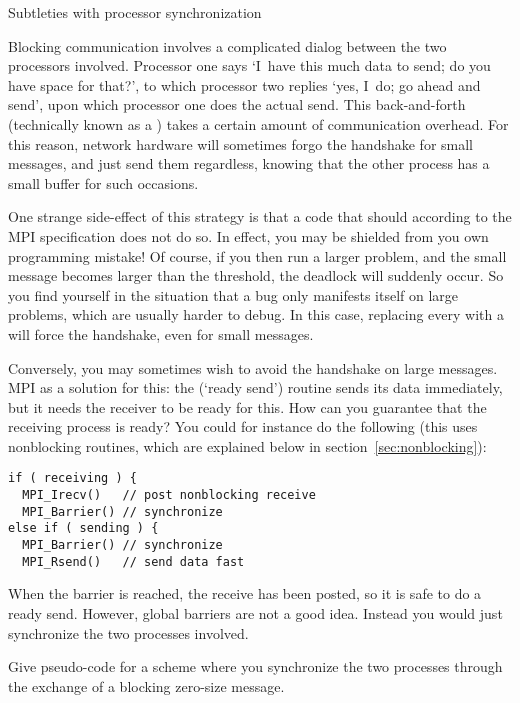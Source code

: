
 {Subtleties with processor synchronization}
\label{sec:handshake}

Blocking communication involves a complicated dialog between the two
processors involved. Processor one says `I~have this much data to
send; do you have space for that?', to which processor two replies
`yes, I~do; go ahead and send', upon which processor one does the
actual send. This back-and-forth (technically known as
a ) takes a certain amount of communication
overhead. For this reason, network hardware will sometimes forgo the
handshake for small messages, and just send them regardless, knowing
that the other process has a small buffer for such occasions.


One strange side-effect of this strategy is that a code that
should  according to the MPI specification does
not do so. In effect, you may be shielded from you own programming
mistake! Of course, if you then run a larger problem, and the small
message becomes larger than the threshold, the deadlock will suddenly
occur. So you find yourself in the situation that a bug only manifests
itself on large problems, which are usually harder to debug.
In this case,
replacing every  with a 
will force the handshake, even for small messages.

Conversely, you may sometimes wish to avoid the handshake on large
messages. MPI as a solution for this: the  (`ready
send') routine sends its data immediately, but it needs the receiver
to be ready for this. How can you guarantee that the receiving process
is ready? You could for instance do the following (this uses
nonblocking routines, which are explained below in
section~\ref{sec:nonblocking}):
\begin{lstlisting}
if ( receiving ) {
  MPI_Irecv()   // post nonblocking receive
  MPI_Barrier() // synchronize
else if ( sending ) {
  MPI_Barrier() // synchronize
  MPI_Rsend()   // send data fast
\end{lstlisting}
When the barrier is reached, the receive has been posted, so it is safe 
to do a ready send. However, global barriers are not a good idea.
Instead you would just synchronize the two processes involved.
\begin{exercise}
  Give pseudo-code for a scheme where you synchronize the two
  processes through the exchange of a blocking zero-size message.
\end{exercise}

